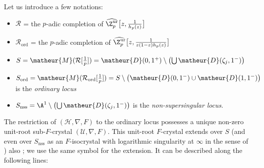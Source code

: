 \medskip
Let us introduce a few notations:
\begin{itemize}
 \item $\mathcal{R}$ = the $p$-adic completion of
       $\widehat{{\Z}_p^{\mathrm{ur}}}\bigl[z,\frac{1}{{h_p(z)}}\bigr]$ 
 \item $\mathcal{R}_{\mathrm{ord}}$ = the $p$-adic completion of
       $\widehat{{\Z}_p^{\mathrm{ur}}}\bigl[z,\frac{1}{{z(1-z)h_p(z)}}\bigr]$
 \item $S=\matheur{M}(\mathcal{R}
       [\frac{1}{p}]) = \matheur{D}(0,1^+) \setminus
       \bigl(\bigcup \matheur{D}(\zeta_j,1^-)\bigr)$
 \item $S_{\mathrm{ord}}=\matheur{M}(\mathcal{R}_{\mathrm{ord}}
       [\frac{1}{p}]) = S\setminus
       \bigl(\matheur{D}(0,1^-)\cup \matheur{D}(1,1^-)\bigr)$
       is the {\it ordinary locus} 
 \item $S_{\mathrm{nss}}= {\A}^1\setminus
       \bigl(\bigcup \matheur{D}(\zeta_j,1^-)\bigr)$
       is the {\it non-supersingular locus}.
\end{itemize}
\noindent The restriction of $(\mathcal{H},\nabla, F)$ to the ordinary
locus possesses a unique non-zero unit-root sub-$F$-crystal
$(\mathcal{U}, \nabla, F)$. This unit-root $F$-crystal extends over $S$
(and even over $S_{\mathrm{nss}}$ as an $F$-isocrystal with logarithmic
singularity at $\infty$ in the sense of \cite{atfff}) \cf also
\cite{ogus00:_ellip}; we use the same
symbol for the extension. It can be described along the following lines:
